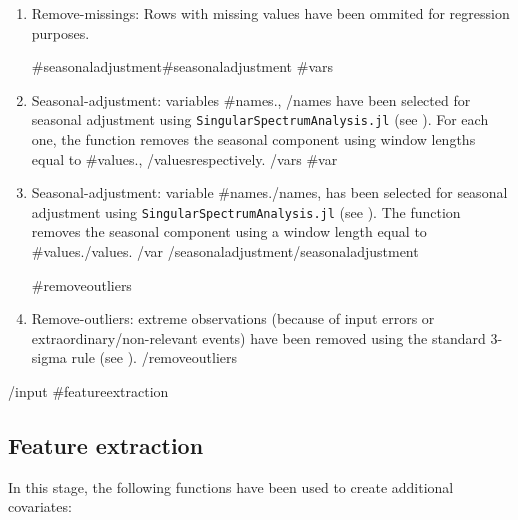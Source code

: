 \documentclass{article}
\begin{document}
\begin{enumerate}
  \item Remove-missings: Rows with missing values have been ommited for regression purposes.

  {{#seasonaladjustment}}{{#seasonaladjustment}}
    {{#vars}}
      \item Seasonal-adjustment: variables {{#names}}{{.}}, {{/names}} have been selected for seasonal adjustment using \verb|SingularSpectrumAnalysis.jl|  (see \cite{hassani2007}). For each one, the function removes the seasonal component using window lengths equal to {{#values}}{{.}}, {{/values}}respectively.
    {{/vars}}
    {{#var}}
      \item Seasonal-adjustment: variable {{#names}}{{.}}{{/names}}, has been selected for seasonal adjustment using \verb|SingularSpectrumAnalysis.jl|  (see \cite{hassani2007}). The function removes the seasonal component using a window length equal to {{#values}}{{.}}{{/values}}.
    {{/var}}
  {{/seasonaladjustment}}{{/seasonaladjustment}}

  {{#removeoutliers}} 
  \item Remove-outliers: extreme observations (because of input errors or extraordinary/non-relevant events) have been removed using the standard 3-sigma rule (see \cite{lehmann2013}).
  {{/removeoutliers}}
\end{enumerate}
{{/input}}
{{#featureextraction}}
\subsection{Feature extraction}

In this stage, the following functions have been used to create additional covariates:  
\end{document}
